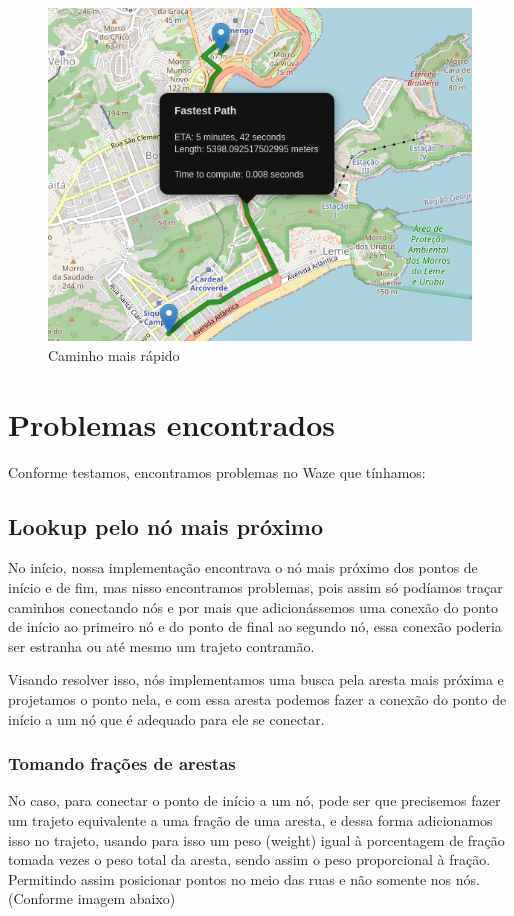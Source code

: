 \documentclass{article}
\begin{document}
\begin{itemize}
\begin{figure}[H]
    \centering
    \includegraphics[scale=0.7]{EDA_path_with_fastest_path.png}
    \caption{Caminho mais rápido}
    \label{fig4}
\end{figure}

\end{itemize}

\section{Problemas encontrados}

Conforme testamos, encontramos problemas no Waze que tínhamos:
\subsection{Lookup pelo nó mais próximo}
No início, nossa implementação encontrava o nó mais próximo dos pontos de início e de fim, mas nisso encontramos problemas, pois assim só podíamos traçar caminhos conectando nós e por mais que adicionássemos uma conexão do ponto de início ao primeiro nó e do ponto de final ao segundo nó, essa conexão poderia ser estranha ou até mesmo um trajeto contramão.

Visando resolver isso, nós implementamos uma busca pela aresta mais próxima e projetamos o ponto nela, e com essa aresta podemos fazer a conexão do ponto de início a um nó que é adequado para ele se conectar.

\subsubsection{Tomando frações de arestas}
No caso, para conectar o ponto de início a um nó, pode ser que precisemos fazer um trajeto equivalente a uma fração de uma aresta, e dessa forma adicionamos isso no trajeto, usando para isso um peso (weight) igual à porcentagem de fração tomada vezes o peso total da aresta, sendo assim o peso proporcional à fração. Permitindo assim posicionar pontos no meio das ruas e não somente nos nós. (Conforme imagem abaixo)
\end{document}
